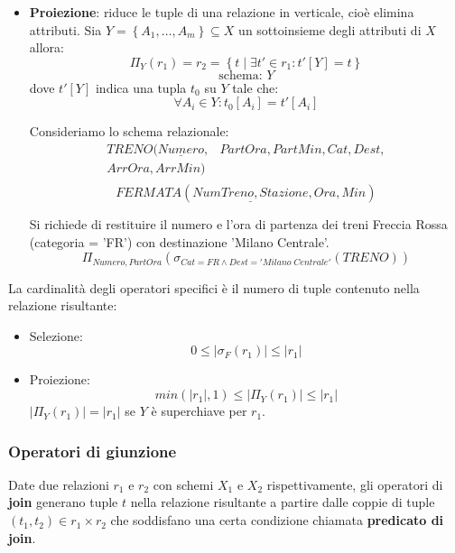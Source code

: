 \documentclass[a4paper,twoside]{article}
\begin{document}
\begin{itemize}
\begin{itemize}
      \item \textbf{Proiezione}: riduce le tuple di una relazione in verticale, cioè
        elimina attributi. Sia \( Y = \left\{ A_1, \ldots, A_m \right\} \subseteq X \) un
        sottoinsieme degli attributi di \( X \) allora:
        \[
          \Pi_Y(r_1) = r_2 = \left\{ t \mid \exists t' \in r_1: t'[Y] = t \right\}
        \] 
        \[
          \text{schema: } Y
        \] 
        dove \( t'[Y] \) indica una tupla \( t_0 \) su \( Y \) tale che:
        \[
          \forall A_i \in Y: t_0[A_i] = t'[A_i]
        \] 


        \begin{example}
          Consideriamo lo schema relazionale:
          \[
            \begin{aligned}
              TRENO(\underline{Numero},& PartOra, PartMin, Cat, Dest,\\ ArrOra, ArrMin)\\
            \end{aligned}
          \] 
          \[
            FERMATA(\underline{NumTreno, Stazione}, Ora, Min)
          \] 

          \vspace{1em}
          \noindent
          Si richiede di restituire il numero e l'ora di partenza dei treni Freccia Rossa
          (categoria = 'FR') con destinazione 'Milano Centrale'.
          \[
            \Pi_{Numero, PartOra}(\sigma_{Cat = FR \land Dest = 'Milano\;Centrale'}(TRENO))
          \] 
        \end{example}
    \end{itemize}
\end{itemize}

La cardinalità degli operatori specifici è il numero di tuple contenuto nella relazione
risultante:
\begin{itemize}
  \item Selezione:
    \[
      0 \leq |\sigma_F(r_1)| \leq |r_1|
    \]

  \item Proiezione:
    \[
      min(|r_1|, 1) \leq |\Pi_Y(r_1)| \leq |r_1|
    \]
    \( |\Pi_Y(r_1)| = |r_1| \) se \( Y \) è superchiave per \( r_1 \).
\end{itemize}

\subsubsection{Operatori di giunzione}
Date due relazioni \( r_1 \) e \( r_2 \) con schemi \( X_1 \) e \( X_2 \) rispettivamente,
gli operatori di \textbf{join} generano tuple \( t \) nella relazione risultante a partire
dalle coppie di tuple \( (t_1, t_2) \in r_1 \times r_2 \) che soddisfano una certa
condizione chiamata \textbf{predicato di join}.
\end{document}
